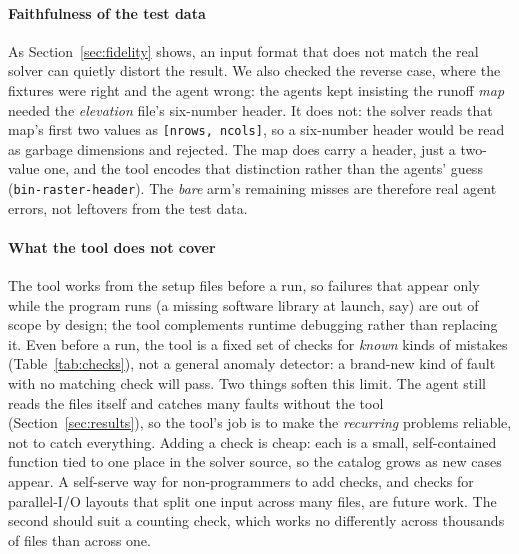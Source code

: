 \documentclass[conference]{IEEEtran}
\begin{document}
\paragraph{Faithfulness of the test data} As Section~\ref{sec:fidelity} shows, an input format
that does not match the real solver can quietly distort the result. We also checked the reverse
case, where the fixtures were right and the agent wrong: the agents kept
insisting the runoff \emph{map} needed the \emph{elevation} file's six-number header. It does
not: the solver reads that map's first two values as \texttt{[nrows,\,ncols]}, so a six-number
header would be read as garbage dimensions and rejected. The map does carry a header, just a
two-value one, and the tool encodes that distinction rather than the agents' guess
(\texttt{bin-raster-header}). The \emph{bare} arm's remaining misses are therefore real agent
errors, not leftovers from the test data.

\paragraph{What the tool does not cover} The tool works from the setup files before a run, so
failures that appear only while the program runs (a missing software library at launch,
say) are out of scope by design; the tool complements runtime debugging rather than replacing
it. Even before a run, the tool is a fixed set of checks for \emph{known} kinds of mistakes
(Table~\ref{tab:checks}), not a general anomaly detector: a brand-new kind of fault with no
matching check will pass. Two things soften this limit. The agent still reads the files itself
and catches many faults without the tool (Section~\ref{sec:results}), so the tool's job is to
make the \emph{recurring} problems reliable, not to catch everything. Adding a check is
cheap: each is a small, self-contained function tied to one place in the solver source, so the
catalog grows as new cases appear. A self-serve way for non-programmers to add checks, and checks for
parallel-I/O layouts that split one input across many files, are future work. The second should suit a counting
check, which works no differently across thousands of files than across one.
\end{document}

